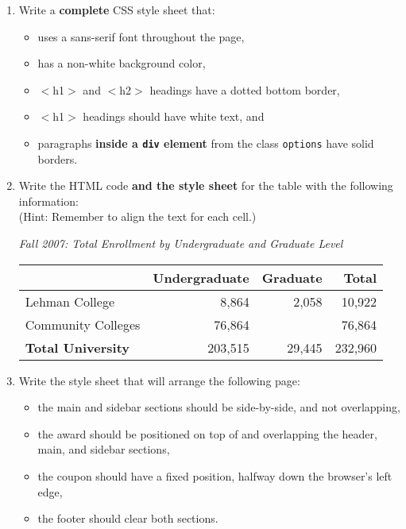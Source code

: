 {{\begin{enumerate}
{\begin{center}
      \end{center} 
}
     
     
\newpage
     \item Write a {\bf complete} CSS style sheet that:
     	\begin{itemize}
		\itemsep 0pt
		\item uses a sans-serif font throughout the page,
		\item has a non-white background color,
		\item $<$h1$>$ and $<$h2$>$ headings have a dotted bottom border,
		\item $<$h1$>$ headings should have white text, and
		\item paragraphs {\bf inside a {\tt div} element} from the class {\tt options} have solid
			borders.

	\end{itemize}
\vspace{2in}
     
     \item Write the HTML code {\bf and the style sheet} for the table with the following information:\\
		(Hint: Remember to align the text for each cell.)
	\begin{center}{\em Fall 2007: Total Enrollment by Undergraduate and Graduate Level}
	\begin{tabular}{|l|r|r|r|}
		\hline
		&{\bf Undergraduate} &	{\bf Graduate} & 	{\bf Total} \\
		\hline
		 Lehman College & 8,864 & 2,058  &  10,922\\
		\hline
		Community Colleges &76,864 & & 76,864\\ 
		\hline
		{\bf Total University} & 203,515 & 29,445 & 232,960\\
		\hline
	\end{tabular}
	\end{center}
\newpage

 

     \item Write the style sheet that will arrange the following page: 
     	\begin{itemize}
		\itemsep 0pt
		\item the main and sidebar sections should be side-by-side, and not overlapping,
		\item the award should be positioned on top of and overlapping the header, main, 
			and sidebar sections,
		\item the coupon should have a fixed position, halfway down the browser's left edge,
		\item the footer should clear both sections.
	\end{itemize}
     

\end{enumerate}}}
